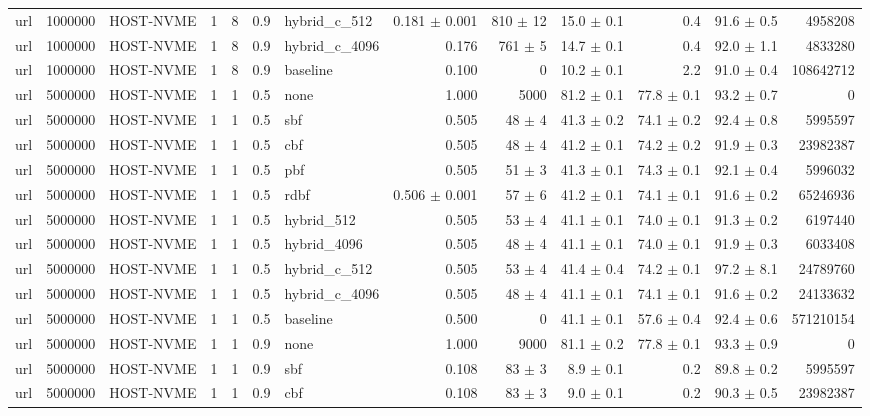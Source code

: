 \begin{tabular}{lllllllrrrrrr}
url & 1000000 & HOST-NVME & 1 & 8 & 0.9 & hybrid\_c\_512 & 0.181 $\pm$ 0.001 & 810 $\pm$ 12 & 15.0 $\pm$ 0.1 & 0.4 & 91.6 $\pm$ 0.5 & 4958208 \\
url & 1000000 & HOST-NVME & 1 & 8 & 0.9 & hybrid\_c\_4096 & 0.176 & 761 $\pm$ 5 & 14.7 $\pm$ 0.1 & 0.4 & 92.0 $\pm$ 1.1 & 4833280 \\
url & 1000000 & HOST-NVME & 1 & 8 & 0.9 & baseline & 0.100 & 0 & 10.2 $\pm$ 0.1 & 2.2 & 91.0 $\pm$ 0.4 & 108642712 \\
url & 5000000 & HOST-NVME & 1 & 1 & 0.5 & none & 1.000 & 5000 & 81.2 $\pm$ 0.1 & 77.8 $\pm$ 0.1 & 93.2 $\pm$ 0.7 & 0 \\
url & 5000000 & HOST-NVME & 1 & 1 & 0.5 & sbf & 0.505 & 48 $\pm$ 4 & 41.3 $\pm$ 0.2 & 74.1 $\pm$ 0.2 & 92.4 $\pm$ 0.8 & 5995597 \\
url & 5000000 & HOST-NVME & 1 & 1 & 0.5 & cbf & 0.505 & 48 $\pm$ 4 & 41.2 $\pm$ 0.1 & 74.2 $\pm$ 0.2 & 91.9 $\pm$ 0.3 & 23982387 \\
url & 5000000 & HOST-NVME & 1 & 1 & 0.5 & pbf & 0.505 & 51 $\pm$ 3 & 41.3 $\pm$ 0.1 & 74.3 $\pm$ 0.1 & 92.1 $\pm$ 0.4 & 5996032 \\
url & 5000000 & HOST-NVME & 1 & 1 & 0.5 & rdbf & 0.506 $\pm$ 0.001 & 57 $\pm$ 6 & 41.2 $\pm$ 0.1 & 74.1 $\pm$ 0.1 & 91.6 $\pm$ 0.2 & 65246936 \\
url & 5000000 & HOST-NVME & 1 & 1 & 0.5 & hybrid\_512 & 0.505 & 53 $\pm$ 4 & 41.1 $\pm$ 0.1 & 74.0 $\pm$ 0.1 & 91.3 $\pm$ 0.2 & 6197440 \\
url & 5000000 & HOST-NVME & 1 & 1 & 0.5 & hybrid\_4096 & 0.505 & 48 $\pm$ 4 & 41.1 $\pm$ 0.1 & 74.0 $\pm$ 0.1 & 91.9 $\pm$ 0.3 & 6033408 \\
url & 5000000 & HOST-NVME & 1 & 1 & 0.5 & hybrid\_c\_512 & 0.505 & 53 $\pm$ 4 & 41.4 $\pm$ 0.4 & 74.2 $\pm$ 0.1 & 97.2 $\pm$ 8.1 & 24789760 \\
url & 5000000 & HOST-NVME & 1 & 1 & 0.5 & hybrid\_c\_4096 & 0.505 & 48 $\pm$ 4 & 41.1 $\pm$ 0.1 & 74.1 $\pm$ 0.1 & 91.6 $\pm$ 0.2 & 24133632 \\
url & 5000000 & HOST-NVME & 1 & 1 & 0.5 & baseline & 0.500 & 0 & 41.1 $\pm$ 0.1 & 57.6 $\pm$ 0.4 & 92.4 $\pm$ 0.6 & 571210154 \\
url & 5000000 & HOST-NVME & 1 & 1 & 0.9 & none & 1.000 & 9000 & 81.1 $\pm$ 0.2 & 77.8 $\pm$ 0.1 & 93.3 $\pm$ 0.9 & 0 \\
url & 5000000 & HOST-NVME & 1 & 1 & 0.9 & sbf & 0.108 & 83 $\pm$ 3 & 8.9 $\pm$ 0.1 & 0.2 & 89.8 $\pm$ 0.2 & 5995597 \\
url & 5000000 & HOST-NVME & 1 & 1 & 0.9 & cbf & 0.108 & 83 $\pm$ 3 & 9.0 $\pm$ 0.1 & 0.2 & 90.3 $\pm$ 0.5 & 23982387 \\

\end{tabular}
